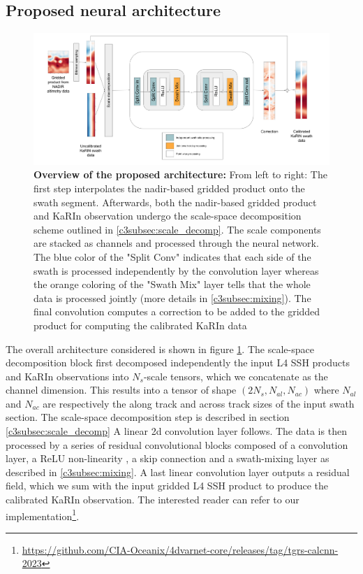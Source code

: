 \begin{bibunit}
\subsection*{Proposed neural architecture}
\label{c3subsec:neural_arch}
\noindent
\begin{figure}
    \begin{center}
	    \includegraphics[width=\textwidth]{00_Calib/CalDiag2.png}
    \end{center}
    \caption{\textbf{Overview of the proposed architecture:} From left to right: The first step interpolates the nadir-based gridded product onto the swath segment. Afterwards, both the nadir-based gridded product and KaRIn observation undergo the scale-space decomposition scheme outlined in \ref{c3subsec:scale_decomp}. The scale components are stacked as channels and processed through the neural network. The blue color of the "Split Conv" indicates that each side of the swath is processed independently by the convolution layer whereas the orange coloring of the "Swath Mix" layer tells that the whole data is processed jointly (more details in \ref{c3subsec:mixing}). The final convolution computes a correction to be added to the gridded product for computing the calibrated KaRIn data}
    \label{c3fig:arch}	
\end{figure}
The overall architecture considered is shown in figure \ref{c3fig:arch}. The scale-space decomposition block first decomposed independently the input L4 SSH products and KaRIn observations
into $N_s$-scale tensors, which we concatenate as the channel dimension.
This results into a tensor of shape $(2N_s, N_{al}, N_{ac})$ where $N_{al}$ and $N_{ac}$ are respectively the along track and across track sizes of the input swath section. The scale-space decomposition step is described in section \ref{c3subsec:scale_decomp}
A linear 2{\sc d} convolution layer follows. 
The data is then processed by a series of residual convolutional blocks composed of a convolution layer, a ReLU non-linearity \cite{Nair_Hinton_2019}, a skip connection and a swath-mixing layer as described in \ref{c3subsec:mixing}. A last linear convolution layer outputs a residual field, which we sum with the input gridded L4 SSH product to produce the calibrated KaRIn observation.
The interested reader can refer to our implementation\footnote{\url{https://github.com/CIA-Oceanix/4dvarnet-core/releases/tag/tgrs-calcnn-2023}}.




\end{bibunit}
